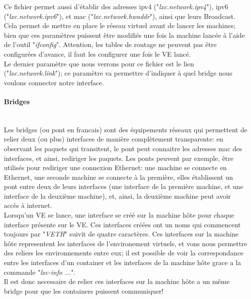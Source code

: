 Ce fichier permet aussi d'\'etablir des adresses ipv4 ("\emph{lxc.network.ipv4}"), ipv6 ("\emph{lxc.network.ipv6}"),
et mac ("\emph{lxc.network.hwaddr}"), ainsi que leurs Broadcast. Cela permet de mettre en place le r\'eseau 
virtuel avant de lancer les machines; bien que ces param\`etres puissent \^etre modifi\'es une fois la machine
lanc\'ee \`a l'aide de l'outil "\emph{ifconfig}". Attention, les tables de routage ne peuvent pas \^etre
configur\'ees d'avance, il faut les configurer une fois le VE lanc\'e.\\

Le dernier param\`etre que nous verrons pour ce fichier est le lien ("\emph{lxc.network.link}"); ce param\`etre
va permettre d'indiquer \`a quel bridge nous voulons connecter notre interface.\\

\paragraph{Bridges}~\\

Les bridges (ou pont en francais) sont des \'equipements r\'eseaux qui permettent de relier deux (ou plus)
interfaces de mani\`ere compl\`etement transparente: en observant les paquets qui transitent, le pont peut 
connaitre les adresses mac des interfaces, et ainsi, rediriger les paquets. Les ponts peuvent par exemple,
\^etre utilis\'es pour rediriger une connexion Ethernet: une machine se connecte en Ethernet, une seconde 
machine se connecte \`a la premi\`ere, elles \'etablissent un pont entre deux de leurs interfaces (une interface
de la premi\`ere machine, et une interface de la deuxi\`eme machine), et, ainsi, la deuxi\`eme machine peut 
avoir acc\`es \`a internet.\\

Lorsqu'un VE se lance, une interface se cr\'e\'e sur la machine h\^ote pour chaque interface pr\'esente sur le VE.
Ces interfaces cr\'e\'ees ont un noms qui commencent toujours par "\emph{VETH}" suivit de quatre caract\`eres. Ces
interfaces sur la machine h\^ote representent les interfaces de l'environement virtuels, et vons nous permettre des
reliers les environnements entre eux; il est possible de voir la correspondance entre les interfaces d'un container
et les interfaces de la machine h\^ote grace a la commande "\emph{lxc-info ...}".\\

Il est donc necessaire de relier ces interfaces sur la machine h\^ote a un m\^eme bridge pour que les 
containers puissent communiquer!
